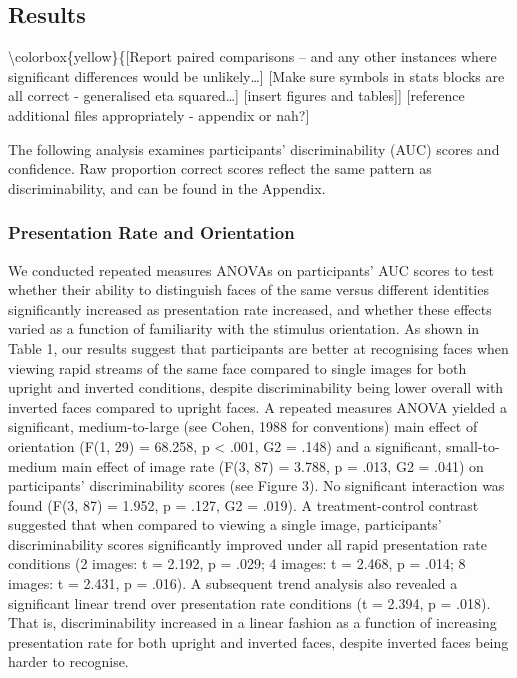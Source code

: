\documentclass[
  english,
  man]{apa6}
\begin{document}
\hypertarget{results}{%
\subsection{Results}\label{results}}

\textbackslash colorbox\{yellow\}\{{[}Report paired comparisons -- and any other instances where significant differences would be unlikely\ldots{]}
{[}Make sure symbols in stats blocks are all correct - generalised eta squared\ldots{]}
{[}insert figures and tables{]}{]}
{[}reference additional files appropriately - appendix or nah?{]}

The following analysis examines participants' discriminability (AUC) scores and confidence. Raw proportion correct scores reflect the same pattern as discriminability, and can be found in the Appendix.

\hypertarget{presentation-rate-and-orientation}{%
\subsubsection{Presentation Rate and Orientation}\label{presentation-rate-and-orientation}}

We conducted repeated measures ANOVAs on participants' AUC scores to test whether their ability to distinguish faces of the same versus different identities significantly increased as presentation rate increased, and whether these effects varied as a function of familiarity with the stimulus orientation. As shown in Table 1, our results suggest that participants are better at recognising faces when viewing rapid streams of the same face compared to single images for both upright and inverted conditions, despite discriminability being lower overall with inverted faces compared to upright faces. A repeated measures ANOVA yielded a significant, medium-to-large (see Cohen, 1988 for conventions) main effect of orientation (F(1, 29) = 68.258, p \textless{} .001, G2 = .148) and a significant, small-to-medium main effect of image rate (F(3, 87) = 3.788, p = .013, G2 = .041) on participants' discriminability scores (see Figure 3). No significant interaction was found (F(3, 87) = 1.952, p = .127, G2 = .019). A treatment-control contrast suggested that when compared to viewing a single image, participants' discriminability scores significantly improved under all rapid presentation rate conditions (2 images: t = 2.192, p = .029; 4 images: t = 2.468, p = .014; 8 images: t = 2.431, p = .016). A subsequent trend analysis also revealed a significant linear trend over presentation rate conditions (t = 2.394, p = .018). That is, discriminability increased in a linear fashion as a function of increasing presentation rate for both upright and inverted faces, despite inverted faces being harder to recognise.
\end{document}
